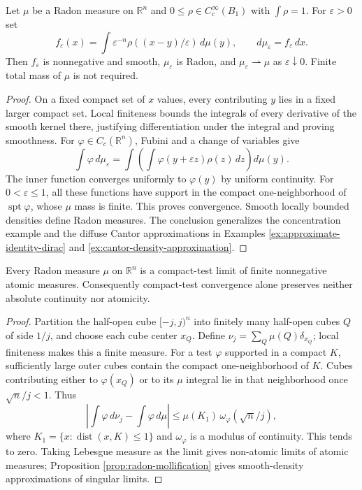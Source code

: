 \begin{proposition}\label{prop:radon-mollification}
Let $\mu$ be a Radon measure on $\mathbb R^n$ and $0\leq\rho\in C_c^\infty(B_1)$ with $\int\rho=1$. For $\varepsilon>0$ set
\[
 f_\varepsilon(x)=\int\varepsilon^{-n}\rho((x-y)/\varepsilon)\,d\mu(y),
 \qquad d\mu_\varepsilon=f_\varepsilon\,dx.
\]
Then $f_\varepsilon$ is nonnegative and smooth, $\mu_\varepsilon$ is Radon, and $\mu_\varepsilon\rightharpoonup\mu$ as $\varepsilon\downarrow0$. Finite total mass of $\mu$ is not required.
\end{proposition}
\begin{proof}
On a fixed compact set of $x$ values, every contributing $y$ lies in a fixed larger compact set. Local finiteness bounds the integrals of every derivative of the smooth kernel there, justifying differentiation under the integral and proving smoothness. For $\varphi\in C_c(\mathbb R^n)$, Fubini and a change of variables give
\[
 \int\varphi\,d\mu_\varepsilon
 =\int\left(\int\varphi(y+\varepsilon z)\rho(z)\,dz\right)d\mu(y).
\]
The inner function converges uniformly to $\varphi(y)$ by uniform continuity. For $0<\varepsilon\leq1$, all these functions have support in the compact one-neighborhood of $\operatorname{spt}\varphi$, whose $\mu$ mass is finite. This proves convergence. Smooth locally bounded densities define Radon measures. The conclusion generalizes the concentration example and the diffuse Cantor approximations in Examples \ref{ex:approximate-identity-dirac} and \ref{ex:cantor-density-approximation}.
\end{proof}

\begin{proposition}\label{prop:radon-atomic-approximation}
Every Radon measure $\mu$ on $\mathbb R^n$ is a compact-test limit of finite nonnegative atomic measures. Consequently compact-test convergence alone preserves neither absolute continuity nor atomicity.
\end{proposition}
\begin{proof}
Partition the half-open cube $[-j,j)^n$ into finitely many half-open cubes $Q$ of side $1/j$, and choose each cube center $x_Q$. Define $\nu_j=\sum_Q\mu(Q)\delta_{x_Q}$; local finiteness makes this a finite measure. For a test $\varphi$ supported in a compact $K$, sufficiently large outer cubes contain the compact one-neighborhood of $K$. Cubes contributing either to $\varphi(x_Q)$ or to its $\mu$ integral lie in that neighborhood once $\sqrt n/j<1$. Thus
\[
 \left|\int\varphi\,d\nu_j-\int\varphi\,d\mu\right|
 \leq\mu(K_1)\,\omega_\varphi(\sqrt n/j),
\]
where $K_1=\{x:\operatorname{dist}(x,K)\leq1\}$ and $\omega_\varphi$ is a modulus of continuity. This tends to zero. Taking Lebesgue measure as the limit gives non-atomic limits of atomic measures; Proposition \ref{prop:radon-mollification} gives smooth-density approximations of singular limits.
\end{proof}
